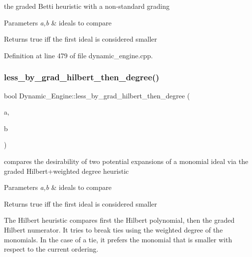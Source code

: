the graded Betti heuristic with a non-\/standard grading 


\begin{DoxyParams}{Parameters}
{\em a,b} & ideals to compare \\
\hline
\end{DoxyParams}
\begin{DoxyReturn}{Returns}
{\ttfamily true} iff the first ideal is considered smaller 
\end{DoxyReturn}


Definition at line 479 of file dynamic\+\_\+engine.\+cpp.

\mbox{\label{namespace_dynamic___engine_a9a6525d0f50053349c5573422f025c22}} 
\subsubsection{\texorpdfstring{less\+\_\+by\+\_\+grad\+\_\+hilbert\+\_\+then\+\_\+degree()}{less\_by\_grad\_hilbert\_then\_degree()}}
{\footnotesize\ttfamily bool Dynamic\+\_\+\+Engine\+::less\+\_\+by\+\_\+grad\+\_\+hilbert\+\_\+then\+\_\+degree (\begin{DoxyParamCaption}\item[{\hyperlink{group___g_b_computation_class_dynamic___engine_1_1_p_p___with___ideal}{P\+P\+\_\+\+With\+\_\+\+Ideal} \&}]{a,  }\item[{\hyperlink{group___g_b_computation_class_dynamic___engine_1_1_p_p___with___ideal}{P\+P\+\_\+\+With\+\_\+\+Ideal} \&}]{b }\end{DoxyParamCaption})}



compares the desirability of two potential expansions of a monomial ideal via the graded Hilbert+weighted degree heuristic 


\begin{DoxyParams}{Parameters}
{\em a,b} & ideals to compare \\
\hline
\end{DoxyParams}
\begin{DoxyReturn}{Returns}
{\ttfamily true} iff the first ideal is considered smaller
\end{DoxyReturn}
The Hilbert heuristic compares first the Hilbert polynomial, then the graded Hilbert numerator. It tries to break ties using the weighted degree of the monomials. In the case of a tie, it prefers the monomial that is smaller with respect to the current ordering. 

